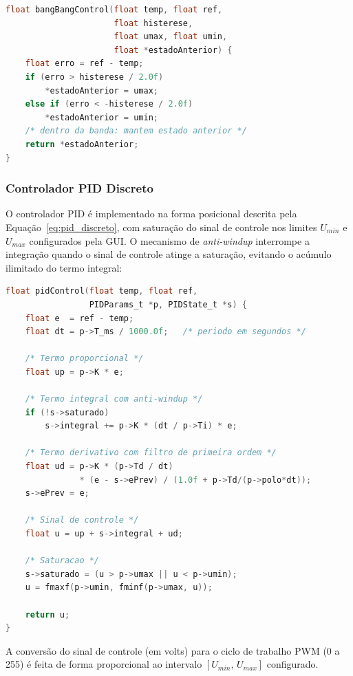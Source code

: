 \documentclass[repeatfields,xlists,xpacks,oneside]{ufrgscca}
\begin{document}
\begin{lstlisting}[language=C, caption={Pseudocódigo do controle bang-bang com histerese.},
                   label={lst:bangbang}]
float bangBangControl(float temp, float ref,
                      float histerese,
                      float umax, float umin,
                      float *estadoAnterior) {
    float erro = ref - temp;
    if (erro > histerese / 2.0f)
        *estadoAnterior = umax;
    else if (erro < -histerese / 2.0f)
        *estadoAnterior = umin;
    /* dentro da banda: mantem estado anterior */
    return *estadoAnterior;
}
\end{lstlisting}

\subsubsection{Controlador PID Discreto}

O controlador PID é implementado na forma posicional descrita
pela Equação~\ref{eq:pid_discreto}, com saturação do
sinal de controle nos limites $U_{min}$ e $U_{max}$
configurados pela GUI\@. O mecanismo de \textit{anti-windup}
interrompe a integração quando o sinal de controle atinge
a saturação, evitando o acúmulo ilimitado do termo integral:

\begin{lstlisting}[language=C, caption={Pseudocódigo do controlador PID discreto com anti-windup.},
                   label={lst:pid}]
float pidControl(float temp, float ref,
                 PIDParams_t *p, PIDState_t *s) {
    float e  = ref - temp;
    float dt = p->T_ms / 1000.0f;   /* periodo em segundos */

    /* Termo proporcional */
    float up = p->K * e;

    /* Termo integral com anti-windup */
    if (!s->saturado)
        s->integral += p->K * (dt / p->Ti) * e;

    /* Termo derivativo com filtro de primeira ordem */
    float ud = p->K * (p->Td / dt)
               * (e - s->ePrev) / (1.0f + p->Td/(p->polo*dt));
    s->ePrev = e;

    /* Sinal de controle */
    float u = up + s->integral + ud;

    /* Saturacao */
    s->saturado = (u > p->umax || u < p->umin);
    u = fmaxf(p->umin, fminf(p->umax, u));

    return u;
}
\end{lstlisting}

A conversão do sinal de controle (em volts) para o ciclo de
trabalho PWM (0 a 255) é feita de forma proporcional ao
intervalo $[U_{min},\,U_{max}]$ configurado.
\end{document}
